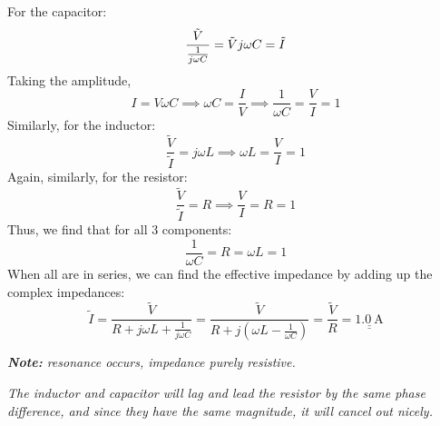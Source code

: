 \documentclass[11pt]{article}
\def\doubleunderline#1{\underline{\underline{#1}}}
\begin{document}
\begin{enumerate}[label={[Q\arabic*]},itemsep={1em}]
			For the capacitor:
			\begin{equation*}
				\frac{\tilde{V}}{\frac{1}{j \omega C}} = \tilde{V}j \omega C = \tilde{I}\\
			\end{equation*}
			Taking the amplitude,
			\begin{equation}
				I = V\!\omega C \implies \omega C = \frac{I}{V} \implies \frac{1}{\omega C} = \frac{V}{I} = 1 \label{eqn:44:capacitor}
			\end{equation}
			Similarly, for the inductor:
			\begin{equation}
				\frac{\tilde{V}}{\tilde{I}} = j\omega L  \implies \omega L = \frac{V}{I} = 1
			\end{equation}
			Again, similarly, for the resistor:
			\begin{equation}
				\frac{\tilde{V}}{\tilde{I}} = R  \implies \frac{V}{I} = R = 1
			\end{equation}
			Thus, we find that for all 3 components:
			\begin{equation*}
				\frac{1}{\omega C} = R = \omega L = 1
			\end{equation*}
			When all are in series, we can find the effective impedance by adding up the complex impedances:
			\begin{equation*}
				\tilde{I} = \frac{\tilde{V}}{R + j\omega L + \frac{1}{j\omega C} } = \frac{\tilde{V}}{R + j\left(\omega L - \frac{1}{\omega C}\right)} = \frac{\tilde{V}}{R} = \doubleunderline{\SI{1.0}{\ampere}}
			\end{equation*}
			
			\textit{\textbf{Note:} resonance occurs, impedance purely resistive.}
				
			\textit{The inductor and capacitor will lag and lead the resistor by the same phase difference, and since they have the same magnitude, it will cancel out nicely.}
			
		

\end{enumerate}
\end{document}

